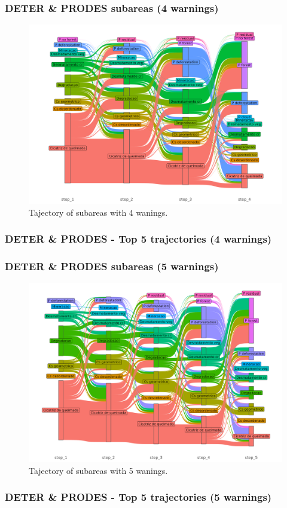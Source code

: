 \documentclass[aspectratio=169]{beamer}
\begin{document}
\begin{frame}
    \frametitle{DETER \& PRODES subareas (4 warnings)}
    \begin{figure}[h] 
        \includegraphics[width=0.65\linewidth]
        {./figures/plot_deter_prodes_subarea_trajectory_4.png}
        \caption{Tajectory of subareas with 4 wanings.}
        \label{fig:deter_prodes_subarea_trajectory_4}
    \end{figure}
\end{frame}

\begin{frame}[allowframebreaks]
    \frametitle{DETER \& PRODES - Top 5 trajectories (4 warnings)}
    
\end{frame}

\begin{frame}
    \frametitle{DETER \& PRODES subareas (5 warnings)}
    \begin{figure}[h] 
        \includegraphics[width=0.65\linewidth]
        {./figures/plot_deter_prodes_subarea_trajectory_5.png}
        \caption{Tajectory of subareas with 5 wanings.}
        \label{fig:deter_prodes_subarea_trajectory_5}
    \end{figure}
\end{frame}

\begin{frame}[allowframebreaks]
    \frametitle{DETER \& PRODES - Top 5 trajectories (5 warnings)}
    
\end{frame}
\end{document}
